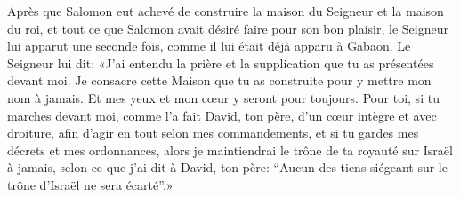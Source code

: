Après que Salomon eut achevé de construire la maison du Seigneur et la maison du roi,
	et tout ce que Salomon avait désiré faire pour son bon plaisir,
	le Seigneur lui apparut une seconde fois, comme il lui était déjà apparu à Gabaon.
Le Seigneur lui dit:
	«J’ai entendu la prière et la supplication que tu as présentées devant moi.
Je consacre cette Maison que tu as construite pour y mettre mon nom à jamais.
	Et mes yeux et mon cœur y seront pour toujours.
Pour toi, si tu marches devant moi,
	comme l’a fait David, ton père, d’un cœur intègre et avec droiture,
	afin d’agir en tout selon mes commandements,
	et si tu gardes mes décrets et mes ordonnances,
	alors je maintiendrai le trône de ta royauté sur Israël à jamais,
	selon ce que j’ai dit à David, ton père:
	“Aucun des tiens siégeant sur le trône d’Israël ne sera écarté”.»
